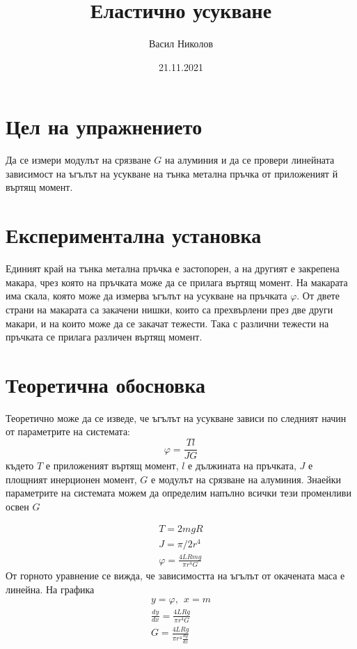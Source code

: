 \documentclass[aps, prb, twocolumn, a4paper, floatfix, reprint]{revtex4-2}
\let\phi\varphi
\begin{document}
\title{Еластично усукване}
\author{Васил Николов}
\noaffiliation
\date{21.11.2021}
\maketitle

\section{Цел на упражнението}
Да се измери модулът на срязване $G$ на алуминия и да се провери линейната зависимост на ъгълът на усукване на тънка метална пръчка от приложеният й въртящ момент.

\section{Експериментална установка}
Единият край на тънка метална пръчка е застопорен, а на другият е закрепена макара, чрез която на пръчката може да се прилага въртящ момент. На макарата има скала, която може да измерва ъгълът на усукване на пръчката $\phi$. От двете страни на макарата са закачени нишки, които са прехвърлени през две други макари, и на които може да се закачат тежести. Така с различни тежести на пръчката се прилага различен въртящ момент.

\section{Теоретична обосновка}
Теоретично може да се изведе, че ъгълът на усукване зависи по следният начин от параметрите на системата:
\begin{equation*}
    \phi=\frac{Tl}{JG}
\end{equation*}
където $T$ е приложеният въртящ момент, $l$ е дължината на пръчката, $J$ е площният инерционен момент, $G$ е модулът на срязване на алуминия. Знаейки параметрите на системата можем да определим напълно всички тези променливи освен $G$

\begin{gather*}
    T=2mgR \\
    J=\pi/2 r^4 \\
    \phi = \frac{4LRmg}{\pi r^4 G} \label{eq:1} \tag{1}
\end{gather*}
От горното уравнение се вижда, че зависимостта на ъгълът от окачената маса е линейна. На графика
\begin{gather*}
    y=\phi , \ \ x=m \\
    \frac{dy}{dx} = \frac{4LRg}{\pi r^4 G} \\
    G = \frac{4LRg}{\pi r^4 \frac{dy}{dx}} \label{eq:2} \tag{2} 
\end{gather*}
\end{document}
